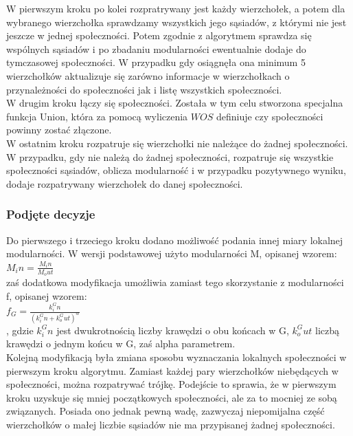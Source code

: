 \documentclass{article}
\begin{document}
W pierwszym kroku po kolei rozpratrywany jest każdy wierzchołek, a potem dla wybranego wierzchołka sprawdzamy wszystkich jego sąsiadów, z którymi nie jest jeszcze w jednej społeczności. Potem zgodnie z algorytmem sprawdza się wspólnych sąsiadów i po zbadaniu modularności ewentualnie dodaje do tymczasowej społeczności. W przypadku gdy osiągnęła ona minimum 5 wierzchołków aktualizuje się zarówno informacje w wierzchołkach o przynależności do społeczności jak i listę wszystkich społeczności.\\

W drugim kroku łączy się społeczności. Została w tym celu stworzona specjalna funkcja Union, która za pomocą wyliczenia $WOS$ definiuje czy społeczności powinny zostać złączone. \\

W ostatnim kroku rozpatruje się wierzchołki nie należące do żadnej społeczności. W przypadku, gdy nie należą do żadnej społeczności, rozpatruje się wszystkie społeczności sąsiadów, oblicza modularność i w przypadku pozytywnego wyniku, dodaje rozpatrywany wierzchołek do danej społeczności.

\subsubsection{Podjęte decyzje}
Do pierwszego i trzeciego kroku dodano możliwość podania innej miary lokalnej modularności. W wersji podstawowej użyto modularności M, opisanej wzorem:\\ $M_in = \frac{M_in}{M_out}$ \\ zaś dodatkowa modyfikacja umożliwia zamiast tego skorzystanie z modularności f, opisanej wzorem:\\ $f_G = \frac{k^G_in}{(k^G_in + k^G_out)^\alpha}$\\, gdzie $k^G_in$ jest dwukrotnością liczby krawędzi o obu końcach w G, $k^G_out$ liczbą krawędzi o jednym końcu w G, zaś alpha parametrem. \\

Kolejną modyfikacją była zmiana sposobu wyznaczania lokalnych społeczności w pierwszym kroku algorytmu. Zamiast każdej pary wierzchołków niebędących w społeczności, można rozpatrywać trójkę. Podejście to sprawia, że w pierwszym kroku uzyskuje się mniej początkowych społeczności, ale za to mocniej ze sobą związanych. Posiada ono jednak pewną wadę, zazwyczaj niepomijalna część wierzchołków o małej liczbie sąsiadów nie ma przypisanej żadnej społeczności.

\end{document}
